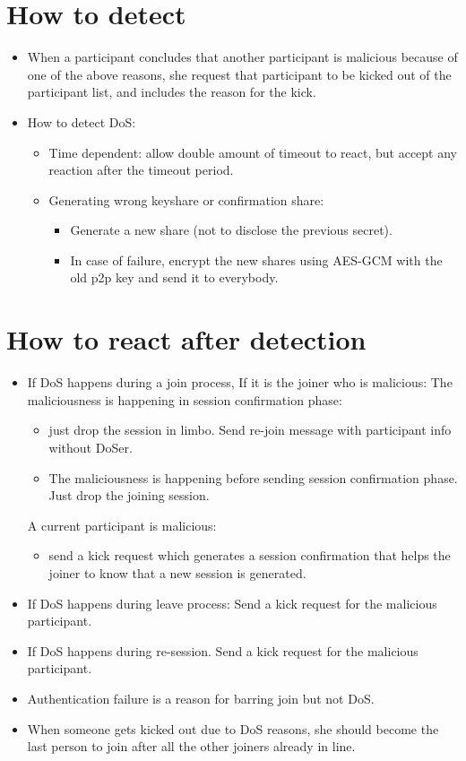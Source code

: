 \documentclass[11pt]{article}
\begin{document}
\section{How to detect}
\label{sec-4}
\begin{itemize}
\item When a participant concludes that another participant is malicious
because of one of the above reasons, she request that participant to be
kicked out of the participant list, and includes the reason for the kick.
\item How to detect DoS:
\begin{itemize}
\item Time dependent: allow double amount of timeout to react, but accept any reaction after the timeout period.
\item Generating wrong keyshare or confirmation share:
\begin{itemize}
\item Generate a new share (not to disclose the previous secret).
\item In case of failure, encrypt the new shares using AES-GCM with the old p2p key and send it to everybody.
\end{itemize}
\end{itemize}
\end{itemize}

\section{How to react after detection}
\label{sec-5}
\begin{itemize}
\item If DoS happens during a join process,
If it is the joiner who is malicious:
   The maliciousness is happening in session confirmation phase:
\begin{itemize}
\item just drop the session in limbo. Send re-join message with participant info without DoSer.
\item The maliciousness is happening before sending session confirmation phase. Just drop the joining session.
\end{itemize}
A current participant is malicious:
\begin{itemize}
\item send a kick request which generates a session confirmation that helps the joiner to know that a new session is generated.
\end{itemize}

\item If DoS happens during leave process:
Send a kick request for the malicious participant.

\item If DoS happens during re-session.
Send a kick request for the malicious participant.

\item Authentication failure is a reason for barring join but not DoS.

\item When someone gets kicked out due to DoS reasons, she should become the
last person to join after all the other joiners already in line.
\end{itemize}
\end{document}
